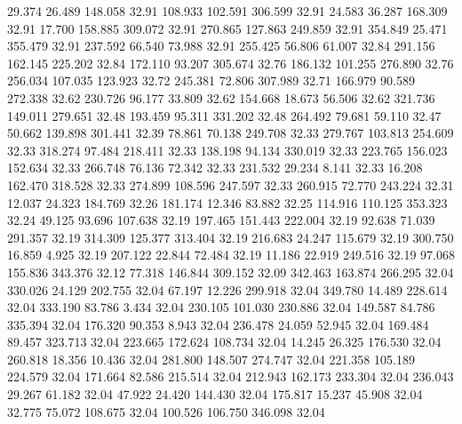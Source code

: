   29.374   26.489  148.058        32.91
 108.933  102.591  306.599        32.91
  24.583   36.287  168.309        32.91
  17.700  158.885  309.072        32.91
 270.865  127.863  249.859        32.91
 354.849   25.471  355.479        32.91
 237.592   66.540   73.988        32.91
 255.425   56.806   61.007        32.84
 291.156  162.145  225.202        32.84
 172.110   93.207  305.674        32.76
 186.132  101.255  276.890        32.76
 256.034  107.035  123.923        32.72
 245.381   72.806  307.989        32.71
 166.979   90.589  272.338        32.62
 230.726   96.177   33.809        32.62
 154.668   18.673   56.506        32.62
 321.736  149.011  279.651        32.48
 193.459   95.311  331.202        32.48
 264.492   79.681   59.110        32.47
  50.662  139.898  301.441        32.39
  78.861   70.138  249.708        32.33
 279.767  103.813  254.609        32.33
 318.274   97.484  218.411        32.33
 138.198   94.134  330.019        32.33
 223.765  156.023  152.634        32.33
 266.748   76.136   72.342        32.33
 231.532   29.234    8.141        32.33
  16.208  162.470  318.528        32.33
 274.899  108.596  247.597        32.33
 260.915   72.770  243.224        32.31
  12.037   24.323  184.769        32.26
 181.174   12.346   83.882        32.25
 114.916  110.125  353.323        32.24
  49.125   93.696  107.638        32.19
 197.465  151.443  222.004        32.19
  92.638   71.039  291.357        32.19
 314.309  125.377  313.404        32.19
 216.683   24.247  115.679        32.19
 300.750   16.859    4.925        32.19
 207.122   22.844   72.484        32.19
  11.186   22.919  249.516        32.19
  97.068  155.836  343.376        32.12
  77.318  146.844  309.152        32.09
 342.463  163.874  266.295        32.04
 330.026   24.129  202.755        32.04
  67.197   12.226  299.918        32.04
 349.780   14.489  228.614        32.04
 333.190   83.786    3.434        32.04
 230.105  101.030  230.886        32.04
 149.587   84.786  335.394        32.04
 176.320   90.353    8.943        32.04
 236.478   24.059   52.945        32.04
 169.484   89.457  323.713        32.04
 223.665  172.624  108.734        32.04
  14.245   26.325  176.530        32.04
 260.818   18.356   10.436        32.04
 281.800  148.507  274.747        32.04
 221.358  105.189  224.579        32.04
 171.664   82.586  215.514        32.04
 212.943  162.173  233.304        32.04
 236.043   29.267   61.182        32.04
  47.922   24.420  144.430        32.04
 175.817   15.237   45.908        32.04
  32.775   75.072  108.675        32.04
 100.526  106.750  346.098        32.04
